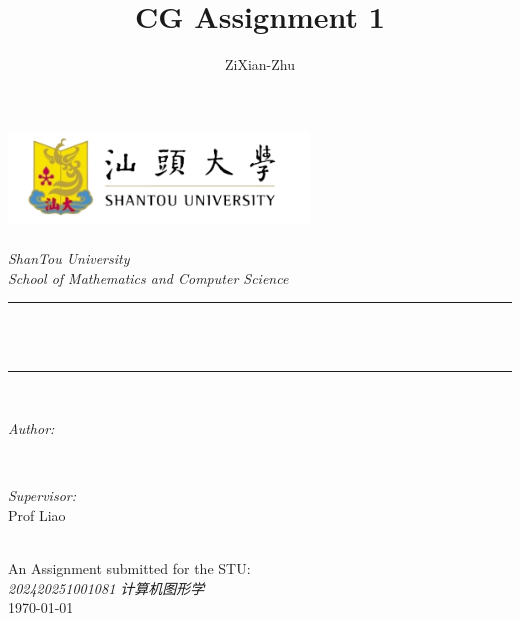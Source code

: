 
\title{CG Assignment 1}
\author{\textup{ZiXian-Zhu}}


\begin{titlepage}
    \newcommand{\HRule}{\rule{\linewidth}{0.5mm}}
    \pagecolor{gray!10} %
    \includegraphics[width=8cm]{figures/stu_logo_3-removebg-preview.png}\\[1cm] 
    \center 
    \quad\\[1.5cm]
    \textsl{\Large ShanTou University}\\[0.5cm] 
    \textsl{\large School of Mathematics and Computer Science}\\[0.5cm] 
    \makeatletter
    \HRule \\[0.4cm]
    { \huge \bfseries \@title}\\[0.4cm] 
    \HRule \\[1.5cm]
    \begin{minipage}{0.4\textwidth}
        \begin{flushleft} \large
            \emph{Author:}\\
            \@author 
        \end{flushleft}
    \end{minipage}
    ~
    \begin{minipage}{0.4\textwidth}
        \begin{flushright} \large
            \emph{Supervisor:} \\
            \textup{Prof Liao}
        \end{flushright}
    \end{minipage}\\[3cm]
    \makeatother
    {\large An Assignment submitted for the STU:}\\[0.5cm]
    {\large \emph{202420251001081 计算机图形学}}\\[0.5cm]
    {\large \today}\\[2cm] 
    \vfill 
\end{titlepage}


